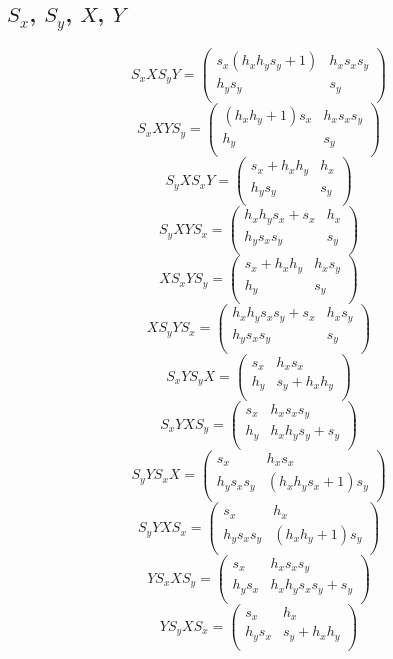 \subsection{$S_x$, $S_y$, $X$, $Y$}

$$S_xXS_yY = \begin{pmatrix} s_x \left( h_x h_y s_y + 1 \right) & h_x s_x s_y \\ h_y s_y & s_y \\ \end{pmatrix} $$
$$S_xXYS_y = \begin{pmatrix} \left( h_x h_y + 1 \right) s_x & h_x s_x s_y \\ h_y & s_y \\ \end{pmatrix} $$
$$S_yXS_xY = \begin{pmatrix} s_x + h_x h_y & h_x \\ h_y s_y & s_y \\ \end{pmatrix} $$
$$S_yXYS_x = \begin{pmatrix} h_x h_y s_x + s_x & h_x \\ h_y s_x s_y & s_y \\ \end{pmatrix} $$
$$XS_xYS_y = \begin{pmatrix} s_x + h_x h_y & h_x s_y \\ h_y & s_y \\ \end{pmatrix} $$
$$XS_yYS_x = \begin{pmatrix} h_x h_y s_x s_y + s_x & h_x s_y \\ h_y s_x s_y & s_y \\ \end{pmatrix} $$
$$S_xYS_yX = \begin{pmatrix} s_x & h_x s_x \\ h_y & s_y + h_x h_y \\ \end{pmatrix} $$
$$S_xYXS_y = \begin{pmatrix} s_x & h_x s_x s_y \\ h_y & h_x h_y s_y + s_y \\ \end{pmatrix} $$
$$S_yYS_xX = \begin{pmatrix} s_x & h_x s_x \\ h_y s_x s_y & \left( h_x h_y s_x + 1 \right) s_y \\ \end{pmatrix} $$
$$S_yYXS_x = \begin{pmatrix} s_x & h_x \\ h_y s_x s_y & \left( h_x h_y + 1 \right) s_y \\ \end{pmatrix} $$
$$YS_xXS_y = \begin{pmatrix} s_x & h_x s_x s_y \\ h_y s_x & h_x h_y s_x s_y + s_y \\ \end{pmatrix} $$
$$YS_yXS_x = \begin{pmatrix} s_x & h_x \\ h_y s_x & s_y + h_x h_y \\ \end{pmatrix} $$ 

